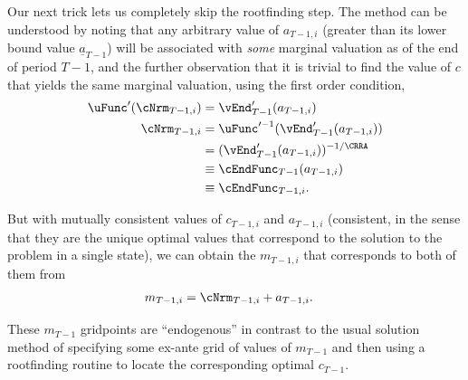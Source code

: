 \documentclass[titlepage, headings=optiontotocandhead]{\econtex}
\begin{document}
Our next trick lets us completely skip the rootfinding step.  The method can be understood by noting that
any arbitrary value of ${a}_{T-1,i}$ (greater than its lower bound
value $\underline{a}_{T-1}$) will be associated with \textit{some}
marginal valuation as of the end of period $T-1$, and the further
observation that it is trivial to find the value of ${c}$ that yields
the same marginal valuation, using the first order condition,
\begin{equation}\begin{gathered}\begin{aligned}
      \uFunc^{\prime}({\cNrm}_{T-1,i})  & = 
      \vEnd^{\prime}_{T-1}({a}_{T-1,i}) \label{eq:eulerTm1}
      \\ {\cNrm}_{T-1,i}  & = \uFunc^{\prime-1}(\vEnd^{\prime}_{T-1}({a}_{T-1,i}))
      \\  & = (\vEnd^{\prime}_{T-1}({a}_{T-1,i}))^{-1/\CRRA}
      \\  & \equiv  \cEndFunc_{T-1}({a}_{T-1,i})
      \\  & \equiv  \cEndFunc_{T-1,i}
      .
    \end{aligned}\end{gathered}\end{equation}

But with mutually consistent values of ${c}_{T-1,i}$ and ${a}_{T-1,i}$ (consistent, in the sense that they are the unique optimal
values that correspond to the solution to the problem in a single state), we can
obtain the ${m}_{T-1,i}$ that corresponds to both of them from
\begin{equation}\begin{gathered}\begin{aligned}
      {m}_{T-1,i}  & = {\cNrm}_{T-1,i}+{a}_{T-1,i}.
    \end{aligned}\end{gathered}\end{equation}

These ${m}_{T-1}$ gridpoints are ``endogenous'' in contrast to the usual solution method of
specifying some ex-ante grid of values of ${m}_{T-1}$ and then using a rootfinding
routine to locate the corresponding optimal ${c}_{T-1}$.
\end{document}
